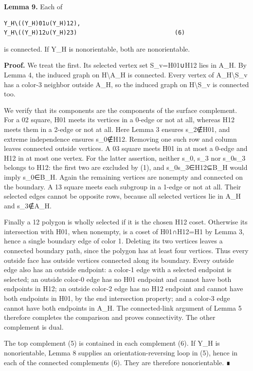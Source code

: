 \documentclass[
  11pt,
  a4paper,
]{article}
\begin{document}
\textbf{Lemma 9.} Each of

\begin{verbatim}
Y_H\((Y_H)01∪(Y_H)12),
Y_H\((Y_H)12∪(Y_H)23)                            (6)
\end{verbatim}

is connected. If Y\_H is nonorientable, both are nonorientable.

\textbf{Proof.} We treat the first. Its selected vertex set S\_v=H01∪H12
lies in A\_H. By Lemma 4, the induced graph on H\textbackslash A\_H is
connected. Every vertex of A\_H\textbackslash S\_v has a color-3
neighbor outside A\_H, so the induced graph on H\textbackslash S\_v is
connected too.

We verify that its components are the components of the surface
complement. For a 02 square, H01 meets its vertices in a 0-edge or not
at all, whereas H12 meets them in a 2-edge or not at all. Here Lemma 3
ensures s\_2∉H01, and extreme independence ensures s\_0∉H12. Removing
one such row and column leaves connected outside vertices. A 03 square
meets H01 in at most a 0-edge and H12 in at most one vertex. For the
latter assertion, neither s\_0, s\_3 nor s\_0s\_3 belongs to H12: the
first two are excluded by (1), and s\_0s\_3∈H12⊆B\_H would imply
s\_0∈B\_H. Again the remaining vertices are nonempty and connected on
the boundary. A 13 square meets each subgroup in a 1-edge or not at all.
Their selected edges cannot be opposite rows, because all selected
vertices lie in A\_H and s\_3∉A\_H.

Finally a 12 polygon is wholly selected if it is the chosen H12 coset.
Otherwise its intersection with H01, when nonempty, is a coset of
H01∩H12=H1 by Lemma 3, hence a single boundary edge of color 1. Deleting
its two vertices leaves a connected boundary path, since the polygon has
at least four vertices. Thus every outside face has outside vertices
connected along its boundary. Every outside edge also has an outside
endpoint: a color-1 edge with a selected endpoint is selected; an
outside color-0 edge has no H01 endpoint and cannot have both endpoints
in H12; an outside color-2 edge has no H12 endpoint and cannot have both
endpoints in H01, by the end intersection property; and a color-3 edge
cannot have both endpoints in A\_H. The connected-link argument of Lemma
5 therefore completes the comparison and proves connectivity. The other
complement is dual.

The top complement (5) is contained in each complement (6). If Y\_H is
nonorientable, Lemma 8 supplies an orientation-reversing loop in (5),
hence in each of the connected complements (6). They are therefore
nonorientable. ∎
\end{document}
